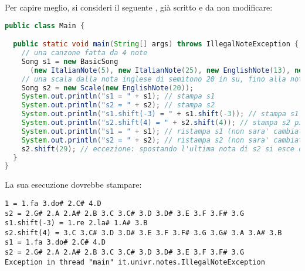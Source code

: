 \documentclass[12pt]{article}
\def\codesize{\smaller}
\def\<#1>{\codeid{#1}}
\newcommand{\codeid}[1]{\ifmmode{\mbox{\codesize\ttfamily{#1}}}\else{\codesize\ttfamily #1}\fi}
\begin{document}
Per capire meglio, si consideri il
seguente \<Main.java>, gi\`a scritto e da non modificare:
%
\begin{lstlisting}[language=Java]
public class Main {

  public static void main(String[] args) throws IllegalNoteException {
    // una canzone fatta da 4 note
    Song s1 = new BasicSong
      (new ItalianNote(5), new ItalianNote(25), new EnglishNote(13), new EnglishNote(38));
    // una scala dalla nota inglese di semitono 20 in su, fino alla nota inglese di semitono 31
    Song s2 = new Scale(new EnglishNote(20));
    System.out.println("s1 = " + s1); // stampa s1
    System.out.println("s2 = " + s2); // stampa s2
    System.out.println("s1.shift(-3) = " + s1.shift(-3)); // stampa s1 meno tre semitoni
    System.out.println("s2.shift(4) = " + s2.shift(4)); // stampa s2 piu' quattro semitoni
    System.out.println("s1 = " + s1); // ristampa s1 (non sara' cambiato)
    System.out.println("s2 = " + s2); // ristampa s2 (non sara' cambiato)
    s2.shift(29); // eccezione: spostando l'ultima nota di s2 si esce dai limiti 0...MAX_SEMITONE
  }
}
\end{lstlisting}
%
La sua esecuzione dovrebbe stampare:
%
\begin{mdframed}[backgroundcolor=lightred]
  {\small\begin{verbatim}
1 = 1.fa 3.do# 2.C# 4.D
s2 = 2.G# 2.A 2.A# 2.B 3.C 3.C# 3.D 3.D# 3.E 3.F 3.F# 3.G
s1.shift(-3) = 1.re 2.la# 1.A# 3.B
s2.shift(4) = 3.C 3.C# 3.D 3.D# 3.E 3.F 3.F# 3.G 3.G# 3.A 3.A# 3.B
s1 = 1.fa 3.do# 2.C# 4.D
s2 = 2.G# 2.A 2.A# 2.B 3.C 3.C# 3.D 3.D# 3.E 3.F 3.F# 3.G
Exception in thread "main" it.univr.notes.IllegalNoteException
\end{verbatim}}
\end{mdframed}
\end{document}
